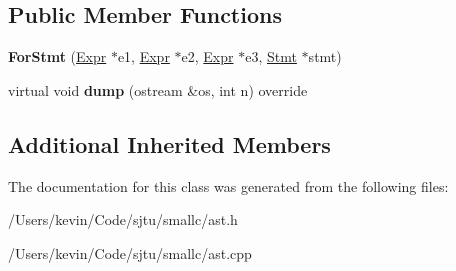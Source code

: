 \subsection*{Public Member Functions}
\begin{DoxyCompactItemize}
\item 
\mbox{\label{class_for_stmt_a4344848679ad4a9a24c2af926cd2fbaa}} 
{\bfseries For\+Stmt} (\hyperlink{class_expr}{Expr} $\ast$e1, \hyperlink{class_expr}{Expr} $\ast$e2, \hyperlink{class_expr}{Expr} $\ast$e3, \hyperlink{class_stmt}{Stmt} $\ast$stmt)
\item 
\mbox{\label{class_for_stmt_ad271254d3347f7eff979e207bd815ce0}} 
virtual void {\bfseries dump} (ostream \&os, int n) override
\end{DoxyCompactItemize}
\subsection*{Additional Inherited Members}


The documentation for this class was generated from the following files\+:\begin{DoxyCompactItemize}
\item 
/\+Users/kevin/\+Code/sjtu/smallc/ast.\+h\item 
/\+Users/kevin/\+Code/sjtu/smallc/ast.\+cpp\end{DoxyCompactItemize}
